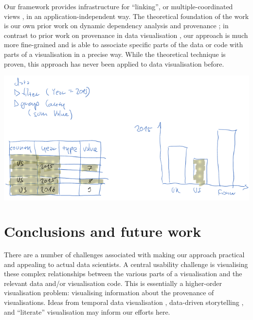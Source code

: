 Our framework provides infrastructure for ``linking'', or multiple-coordinated
views \cite{tobiasz09}, in an application-independent way. The theoretical
foundation of the work is our own prior work on dynamic dependency analysis and
provenance \cite{perera16d, ricciotti17}; in contrast to prior work on
provenance in data visualisation \cite{callahan06}, our approach is much more
fine-grained and is able to associate specific parts of the data or code with
parts of a visualisation in a precise way. While the theoretical technique is
proven, this approach has never been applied to data visualisation before.

\includegraphics[scale=0.35]{image/chart-bwd}

\section{Conclusions and future work}

There are a number of challenges associated with making our approach practical
and appealing to actual data scientists. A central usability challenge is
visualising these complex relationships between the various parts of a
visualisation and the relevant data and/or visualisation code. This is
essentially a higher-order visualisation problem: visualising information about
the provenance of visualisations. Ideas from temporal data visualisation
\cite{bach16}, data-driven storytelling \cite{bach18}, and ``literate''
visualisation \cite{wood19} may inform our efforts here.
